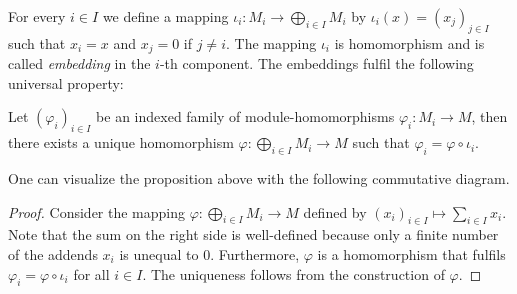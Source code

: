 For every $i\in I$ we define a mapping $\iota_i\colon M_i\to \bigoplus_{i\in I}M_i$ by $\iota_i(x)=(x_j)_{j\in I}$ such that $x_i=x$ and $x_j=0$ if $j\neq i$. The mapping $\iota_i$ is homomorphism and is called \textit{embedding} in the $i$-th component. The embeddings fulfil the following universal property:

\begin{prop}\label{prop.UniversalPropertyDirectSum}
Let $(\varphi_i)_{i\in I}$ be an indexed family of module-homomorphisms $\varphi_i\colon M_i\to M$, then there exists a unique homomorphism $\varphi\colon\bigoplus_{i\in I}M_i\to M$ such that $\varphi_i=\varphi\circ\iota_i$.
\end{prop}

One can visualize the proposition above with the following commutative diagram.
\begin{center}
\end{center}


\begin{proof}
Consider the mapping $\varphi\colon\bigoplus_{i\in I}M_i\to M$ defined by $(x_i)_{i\in I}\mapsto\sum_{i\in I}x_i$. Note that the sum on the right side is well-defined because only a finite number of the addends $x_i$ is unequal to 0. Furthermore, $\varphi$ is a homomorphism that fulfils $\varphi_i=\varphi\circ\iota_i$ for all $i\in I$. The uniqueness follows from the construction of $\varphi$.
\end{proof}

%
